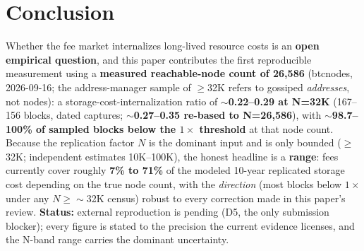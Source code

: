 \documentclass[11pt]{article}
\begin{document}
\section{Conclusion}\label{sec:9}
Whether the fee market internalizes long-lived resource costs is an \textbf{open empirical question}, and this paper contributes the first reproducible measurement using a \textbf{measured reachable-node count of 26{,}586} (btcnodes, 2026-09-16; the address-manager sample of $\geq$32K refers to gossiped \emph{addresses}, not nodes): a storage-cost-internalization ratio of \textbf{$\sim$0.22--0.29 at N=32K} (167--156 blocks, dated captures; \textbf{$\sim$0.27--0.35 re-based to N=26{,}586}), with \textbf{$\sim$98.7--100\% of sampled blocks below the $1\times$ threshold} at that node count. Because the replication factor $N$ is the dominant input and is only bounded ($\geq$32K; independent estimates 10K--100K), the honest headline is a \textbf{range}: fees currently cover roughly \textbf{7\% to 71\%} of the modeled 10-year replicated storage cost depending on the true node count, with the \emph{direction} (most blocks below $1\times$ under any $N \geq \sim$32K census) robust to every correction made in this paper's review. \textbf{Status:} external reproduction is pending (D5, the only submission blocker); every figure is stated to the precision the current evidence licenses, and the N-band range carries the dominant uncertainty.
\end{document}
